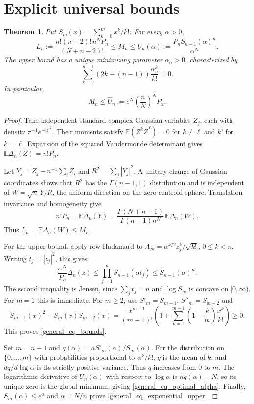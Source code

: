 \documentclass[11pt]{article}
\newtheorem{theorem}{Theorem}[section]
\theoremstyle{remark}
\newcommand{\E}{\mathbb E}
\numberwithin{equation}{section}
\begin{document}
\section{Explicit universal bounds}
\label{general_sec_bounds}
\begin{theorem}\label{general_thm_bounds}
Put $S_m(x)=\sum_{k=0}^m x^k/k!$. For every $\alpha>0$,
\begin{equation}\label{general_eq_bounds}
 L_n:=\frac{n!(n-2)!\,n^N P_n}{(N+n-2)!}
 \le M_n\le U_n(\alpha):=\frac{P_n S_{n-1}(\alpha)^n}{\alpha^N}.
\end{equation}
The upper bound has a unique minimizing parameter $\alpha_n>0$,
characterized by
\begin{equation}\label{general_eq_optimal_alpha}
 \sum_{k=0}^{n-1}(2k-(n-1))\frac{\alpha_n^k}{k!}=0.
\end{equation}
In particular,
\begin{equation}\label{general_eq_exponential_upper}
 M_n\le\widehat U_n:=e^N\left(\frac nN\right)^NP_n.
\end{equation}
\end{theorem}
\begin{proof}
Take independent standard complex Gaussian variables $Z_j$,
each with density $\pi^{-1}e^{-|z|^2}$. Their moments satisfy
$\E(Z^k\overline Z^{\,\ell})=0$ for $k\ne\ell$ and $k!$ for $k=\ell$.
Expansion of the squared Vandermonde determinant gives
$\E\Delta_n(Z)=n!P_n$.

Let $Y_j=Z_j-n^{-1}\sum_iZ_i$ and $R^2=\sum_j|Y_j|^2$.
A unitary change of Gaussian coordinates shows that $R^2$ has the
$\Gamma(n-1,1)$ distribution and is independent of
$W=\sqrt n\,Y/R$, the uniform direction on the zero-centroid sphere.
Translation invariance and homogeneity give
\[
 n!P_n=\E\Delta_n(Y)
 =\frac{\Gamma(N+n-1)}{\Gamma(n-1)n^N}\,\E\Delta_n(W).
\]
Thus $L_n=\E\Delta_n(W)\le M_n$.

For the upper bound, apply row Hadamard to
$A_{jk}=\alpha^{k/2}z_j^k/\sqrt{k!}$, $0\le k<n$.
Writing $t_j=|z_j|^2$, this gives
\[
 \frac{\alpha^N}{P_n}\Delta_n(z)
 \le\prod_{j=1}^nS_{n-1}(\alpha t_j)
 \le S_{n-1}(\alpha)^n.
\]
The second inequality is Jensen, since $\sum_jt_j=n$
and $\log S_m$ is concave on $[0,\infty)$.
For $m=1$ this is immediate. For $m\ge2$, use $S'_m=S_{m-1}$,
$S''_m=S_{m-2}$ and
\[
 S_{m-1}(x)^2-S_m(x)S_{m-2}(x)
 =\frac{x^{m-1}}{(m-1)!}
 \left(1+\sum_{k=1}^{m-1}
         \left(1-\frac km\right)\frac{x^k}{k!}\right)\ge0.
\]
This proves \eqref{general_eq_bounds}.

Set $m=n-1$ and $q(\alpha)=\alpha S'_m(\alpha)/S_m(\alpha)$.
For the distribution on $\{0,\ldots,m\}$ with probabilities
proportional to $\alpha^k/k!$, $q$ is the mean of $k$, and
$dq/d\log\alpha$ is its strictly positive variance.
Thus $q$ increases from $0$ to $m$. The logarithmic derivative of
$U_n(\alpha)$ with respect to $\log\alpha$ is $nq(\alpha)-N$,
so its unique zero is the global minimum, giving
\eqref{general_eq_optimal_alpha}. Finally, $S_m(\alpha)\le e^\alpha$
and $\alpha=N/n$ prove \eqref{general_eq_exponential_upper}.
\end{proof}
\end{document}
